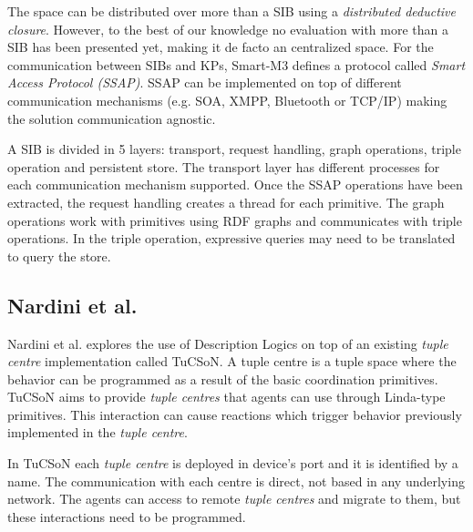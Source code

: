 The space can be distributed over more than a SIB using a \emph{distributed deductive closure}. %
However, to the best of our knowledge no evaluation with more than a SIB has been presented yet, making it de facto an centralized space.
For the communication between SIBs and KPs, Smart-M3 defines a protocol called \emph{Smart Access Protocol (SSAP)}.
SSAP can be implemented on top of different communication mechanisms (e.g. SOA, XMPP, Bluetooth or TCP/IP) making the solution communication agnostic. %


A SIB is divided in 5 layers: transport, request handling, graph operations, triple operation and persistent store.
The transport layer has different processes for each communication mechanism supported.
Once the SSAP operations have been extracted, the request handling creates a thread for each primitive.
The graph operations work with primitives using RDF graphs and communicates with triple operations.
In the triple operation, expressive queries may need to be translated to query the store.





\subsection{Nardini et al.}

Nardini et al. \cite{TODO} explores the use of Description Logics on top of an existing \emph{tuple centre} implementation called TuCSoN. %
A tuple centre is a tuple space where the behavior can be programmed as a result of the basic coordination primitives.
TuCSoN aims to provide \emph{tuple centres} that agents can use through Linda-type primitives.
This interaction can cause reactions which trigger behavior previously implemented in the \emph{tuple centre}.

In TuCSoN each \emph{tuple centre} is deployed in device's port and it is identified by a name.
The communication with each centre is direct, not based in any underlying network. %
The agents can access to remote \emph{tuple centres} and migrate to them, but these interactions need to be programmed.

